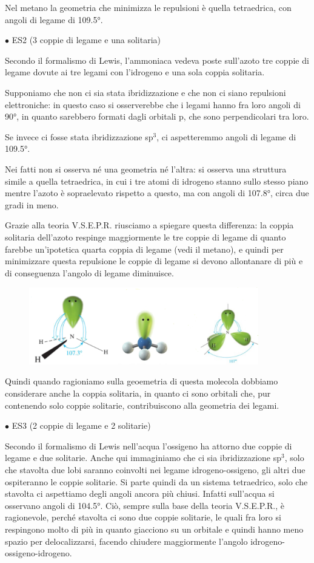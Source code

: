 Nel metano la geometria che minimizza le repulsioni è quella tetraedrica, con angoli di legame di 109.5°.

$\bullet$ ES2  (3 coppie di legame e una solitaria)

Secondo il formalismo di Lewis, l'ammoniaca vedeva poste sull'azoto tre coppie di legame dovute ai tre legami con l'idrogeno e una sola coppia solitaria.
    
Supponiamo che non ci sia stata ibridizzazione e che non ci siano repulsioni elettroniche: in questo caso si osserverebbe che i legami hanno fra loro angoli di 90°, in quanto sarebbero formati dagli orbitali p, che sono perpendicolari tra loro.
    
Se invece ci fosse stata ibridizzazione sp$^3$, ci aspetteremmo angoli di legame di 109.5°.
    
Nei fatti non si osserva né una geometria né l'altra: si osserva una struttura simile a quella tetraedrica, in cui i tre atomi di idrogeno stanno sullo stesso piano mentre l'azoto è sopraelevato rispetto a questo, ma con angoli di 107.8°, circa due gradi in meno.
    
Grazie alla teoria V.S.E.P.R. riusciamo a spiegare questa differenza: la coppia solitaria dell'azoto respinge maggiormente le tre coppie di legame di quanto farebbe un'ipotetica quarta coppia di legame (vedi il metano), e quindi per minimizzare questa repulsione le coppie di legame si devono allontanare di più e di conseguenza l'angolo di legame diminuisce.
\begin{figure}[htp]
    \centering
    \includegraphics[width=10cm]{immagini/ammoniaca.png}
\end{figure}
Quindi quando ragioniamo sulla geoemetria di questa molecola dobbiamo considerare anche la coppia solitaria, in quanto ci sono orbitali che, pur contenendo solo coppie solitarie, contribuiscono alla geometria dei legami.

$\bullet$ ES3  (2 coppie di legame e 2 solitarie)

Secondo il formalismo di Lewis nell'acqua l'ossigeno ha attorno due coppie di legame e due solitarie. Anche qui immaginiamo che ci sia ibridizzazione sp$^3$, solo che stavolta due lobi saranno coinvolti nei legame idrogeno-ossigeno, gli altri due ospiteranno le coppie solitarie. Si parte quindi da un sistema tetraedrico, solo che stavolta ci aspettiamo degli angoli ancora più chiusi. Infatti sull'acqua si osservano angoli di 104.5°. Ciò, sempre sulla base della teoria V.S.E.P.R., è ragionevole, perché stavolta ci sono due coppie solitarie, le quali fra loro si respingono molto di più in quanto giacciono su un orbitale e quindi hanno meno spazio per delocalizzarsi, facendo chiudere maggiormente l'angolo idrogeno-ossigeno-idrogeno.
    
